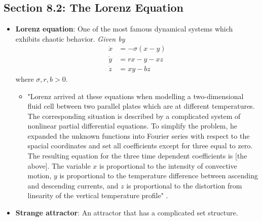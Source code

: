 \documentclass[../notes.tex]{subfiles}
\begin{document}
\subsection*{Section 8.2: The Lorenz Equation}
\begin{itemize}
    \item \textbf{Lorenz equation}: One of the most famous dynamical systems which exhibits chaotic behavior. \emph{Given by}
    \begin{align*}
        \dot{x} &= -\sigma(x-y)\\
        \dot{y} &= rx-y-xz\\
        \dot{z} &= xy-bz
    \end{align*}
    where $\sigma,r,b>0$.
    \begin{itemize}
        \item "Lorenz arrived at these equations when modelling a two-dimensional fluid cell between two parallel plates which are at different temperatures. The corresponding situation is described by a complicated system of nonlinear partial differential equations. To simplify the problem, he expanded the unknown functions into Fourier series with respect to the spacial coordinates and set all coefficients except for three equal to zero. The resulting equation for the three time dependent coefficients is [the above]. The variable $x$ is proportional to the intensity of convective motion, $y$ is proportional to the temperature difference between ascending and descending currents, and $z$ is proportional to the distortion from linearity of the vertical temperature profile" \parencite[234]{bib:Teschl}.
    \end{itemize}
    \item \textbf{Strange attractor}: An attractor that has a complicated set structure.
\end{itemize}
\end{document}

